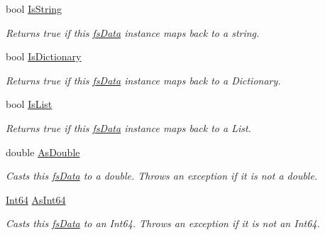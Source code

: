 \begin{DoxyCompactItemize}
bool \hyperlink{class_full_serializer_1_1fs_data_a95589f68382f863386617a0dd4055ae4}{Is\+String}
\begin{DoxyCompactList}\small\item\em Returns true if this \hyperlink{class_full_serializer_1_1fs_data}{fs\+Data} instance maps back to a string. \end{DoxyCompactList}\item 
bool \hyperlink{class_full_serializer_1_1fs_data_a493e25ed3252e4a381a1cd47b9a1559e}{Is\+Dictionary}
\begin{DoxyCompactList}\small\item\em Returns true if this \hyperlink{class_full_serializer_1_1fs_data}{fs\+Data} instance maps back to a Dictionary. \end{DoxyCompactList}\item 
bool \hyperlink{class_full_serializer_1_1fs_data_a1d61e9ed3a74d32dc46f9a4d4c1285f7}{Is\+List}
\begin{DoxyCompactList}\small\item\em Returns true if this \hyperlink{class_full_serializer_1_1fs_data}{fs\+Data} instance maps back to a List. \end{DoxyCompactList}\item 
double \hyperlink{class_full_serializer_1_1fs_data_a3b742582f73e3eb166bcc6df88b2ffd9}{As\+Double}
\begin{DoxyCompactList}\small\item\em Casts this \hyperlink{class_full_serializer_1_1fs_data}{fs\+Data} to a double. Throws an exception if it is not a double. \end{DoxyCompactList}\item 
\hyperlink{namespace_full_serializer_a6eee33d63b94e40fdfcfc59af9fcfc82afbde23b11d7e59af7828e81144c8b487}{Int64} \hyperlink{class_full_serializer_1_1fs_data_a47a5cdaefdb6afc7f2bdaa026befdc00}{As\+Int64}
\begin{DoxyCompactList}\small\item\em Casts this \hyperlink{class_full_serializer_1_1fs_data}{fs\+Data} to an Int64. Throws an exception if it is not an Int64. \end{DoxyCompactList}\item 

\end{DoxyCompactItemize}
